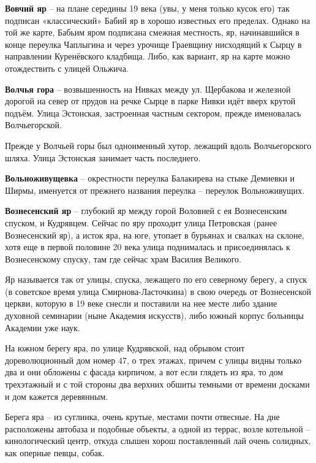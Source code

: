 \medskip

\textbf{Вовчий яр} – на плане середины 19 века (увы, у меня только кусок его) так подписан «классический» Бабий яр в хорошо известных его пределах. Однако на той же карте, Бабьим яром подписана смежная местность, яр, начинавшийся в конце переулка Чаплыгина и через урочище Граевщину нисходящий к Сырцу в направлении Куренёвского кладбища. Либо, как вариант, яр на карте можно отождествить с улицей Ольжича.\\

\medskip

\textbf{Волчья гора} – возвышенность на Нивках между ул. Щербакова и железной дорогой на север от прудов на речке Сырце в парке Нивки идёт вверх крутой подъём. Улица Эстонская, застроенная частным сектором, прежде именовалась Волчьегорской.

Прежде у Волчьей горы был одноименный хутор, лежащий вдоль Волчьегорского шляха. Улица Эстонская занимает часть последнего.\\

\medskip

\textbf{Вольноживущевка} – окрестности переулка Балакирева на стыке Демиевки и Ширмы, именуется от прежнего названия переулка – переулок Вольноживущих.\\

\medskip

\textbf{Вознесенский яр} – глубокий яр между горой Воловней с ея Вознесенским спуском, и Кудрявцем. Сейчас по яру проходит улица Петровская (ранее Вознесенский яр), а исток яра, на юге, утопает в бурьянах и свалках на склоне, хотя еще в первой половине 20 века улица поднималась и присоединялась к Вознесенскому спуску, там где сейчас храм Василия Великого. 

Яр называется так от улицы, спуска, лежащего по его северному берегу, а спуск (в советское время улица Смирнова-Ласточкина) в свою очередь от Вознесенской церкви, которую в 19 веке снесли и поставили на нее месте либо здание духовной семинарии (ныне Академия искусств), либо южный корпус больницы Академии уже наук.

На южном берегу яра, по улице Кудрявской, над обрывом стоит дореволюционный дом номер 47, о трех этажах, причем с улицы видны только два и они обложены с фасада кирпичом, а вот если глядеть из яра, то дом трехэтажный и с той стороны два верхних обшиты темными от времени досками и дом кажется деревянным.

Берега яра – из суглинка, очень крутые, местами почти отвесные. На дне расположены автобаза и подобные объекты, а одной из террас, возле котельной – кинологический центр, откуда слышен хорош поставленный лай очень солидных, как оперные певцы, собак.\\

